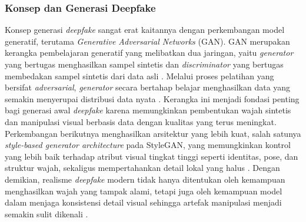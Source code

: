 \subsubsection{Konsep dan Generasi Deepfake} \label{II.Teori1.2}
Konsep generasi \textit{deepfake} sangat erat kaitannya dengan perkembangan model generatif, terutama \textit{Generative Adversarial Networks} (GAN). GAN merupakan kerangka pembelajaran generatif yang melibatkan dua jaringan, yaitu \textit{generator} yang bertugas menghasilkan sampel sintetis dan \textit{discriminator} yang bertugas membedakan sampel sintetis dari data asli \cite{NIPS2014_f033ed80}. Melalui proses pelatihan yang bersifat \textit{adversarial}, \textit{generator} secara bertahap belajar menghasilkan data yang semakin menyerupai distribusi data nyata \cite{NIPS2014_f033ed80}. Kerangka ini menjadi fondasi penting bagi generasi awal \textit{deepfake} karena memungkinkan pembentukan wajah sintetis dan manipulasi visual berbasis data dengan kualitas yang terus meningkat. Perkembangan berikutnya menghasilkan arsitektur yang lebih kuat, salah satunya \textit{style-based generator architecture} pada StyleGAN, yang memungkinkan kontrol yang lebih baik terhadap atribut visual tingkat tinggi seperti identitas, pose, dan struktur wajah, sekaligus mempertahankan detail lokal yang halus \cite{karras2019stylebasedgeneratorarchitecturegenerative}. Dengan demikian, realisme \textit{deepfake} modern tidak hanya ditentukan oleh kemampuan menghasilkan wajah yang tampak alami, tetapi juga oleh kemampuan model dalam menjaga konsistensi detail visual sehingga artefak manipulasi menjadi semakin sulit dikenali \cite{NIPS2014_f033ed80,karras2019stylebasedgeneratorarchitecturegenerative}. \par

